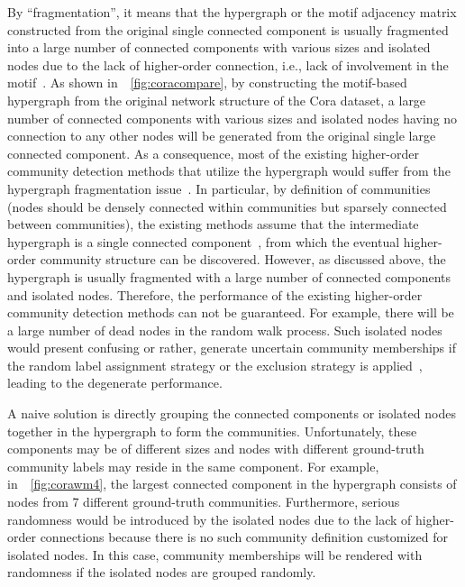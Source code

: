 \documentclass[sigconf]{acmart}
\begin{document}
By ``fragmentation'', it means that the hypergraph or the motif adjacency matrix constructed from the original single connected component is usually fragmented into a large number of connected components with various sizes and isolated nodes due to the lack of higher-order connection, i.e., lack of involvement in the motif~\cite{zhao2015gsparsify}. As shown in~\figurename~\ref{fig:coracompare}, by constructing the motif-based hypergraph from the original network structure of the Cora dataset, a large number of connected components with various sizes and isolated nodes having no connection to any other nodes will be generated from the original single large connected component. As a consequence, most of the existing higher-order community detection methods that utilize the hypergraph would suffer from the hypergraph fragmentation issue~\cite{tsourakakis2017scalable,zhao2015gsparsify,benson2016higher}. In particular, by definition of communities (nodes should be densely connected within communities but sparsely connected between communities), the existing methods assume that the intermediate hypergraph is a single connected component~\cite{benson2016higher,tsourakakis2017scalable}, from which the eventual higher-order community structure can be discovered. However, as discussed above, the hypergraph is usually fragmented with a large number of connected components and isolated nodes. Therefore, the performance of the existing higher-order community detection methods can not be guaranteed.
For example, there will be a large number of dead nodes in the random walk process. Such isolated nodes would present confusing or rather, generate uncertain community memberships if the random label assignment strategy or the exclusion strategy is applied~\cite{kaiser2008mean}, leading to the degenerate performance.

A naive solution is directly grouping the connected components or isolated nodes together in the hypergraph to form the communities. Unfortunately, these components may be of different sizes and nodes with different ground-truth community labels may reside in the same component. For example, in~\figurename~\ref{fig:corawm4}, the largest connected component in the hypergraph consists of nodes from 7 different ground-truth communities. Furthermore, serious randomness would be introduced by the isolated nodes due to the lack of higher-order connections because there is no such community definition customized for isolated nodes. In this case, community memberships will be rendered with randomness if the isolated nodes are grouped randomly.
\end{document}
